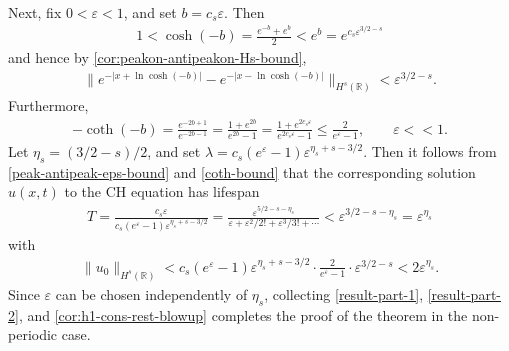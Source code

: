 \documentclass[12pt,reqno]{amsart}
\numberwithin{equation}{section}  %
\numberwithin{figure}{section}
\newcommand{\rr}{\mathbb{R}}
\newcommand{\ee}{\varepsilon}
\theoremstyle{plain}  %
\theoremstyle{definition}
\begin{document}
\\
Next, fix $0<\ee<1$, and set $b = c_s \ee$. Then
%
%
\begin{equation*}
  \begin{split}
    1 < \cosh(-b) = \frac{e^{-b}+ e^{b}}{2} < e^{b} = e^{c_s \ee^{3/2 - s}}
  \end{split}
\end{equation*}
%
%
and hence by \autoref{cor:peakon-antipeakon-Hs-bound},
%
%
%
%
\begin{equation}
  \label{peak-antipeak-eps-bound}
  \begin{split}
    \|e^{-| x + \ln \cosh (-b) |} - e^{-| x - \ln \cosh(-b) |}\|_{H^{s}(\rr)} <
    \ee^{3/2 - s}.
  \end{split}
\end{equation}
%
%
Furthermore,
%
%
\begin{equation}
  \label{coth-bound}
  \begin{split}
    -\coth(-b) = \frac{e^{-2b + 1}}{e^{-2b - 1}} = \frac{1 +
    e^{2b}}{e^{2b}-1} = \frac{1 + e^{2c_{s} \ee}}{e^{2c_{s}\ee} -1} \le
    \frac{2}{e^{\ee} -1}, \qquad \ee <<1.
  \end{split}
\end{equation}
%
%
Let $\eta_s = (3/2- s)/2$, and set $\lambda = c_{s}(e^{\ee}-1)\ee^{\eta_s + s-3/2}$. Then it follows from
\eqref{peak-antipeak-eps-bound} and \eqref{coth-bound} that the corresponding solution
$u(x,t)$ to the CH equation has lifespan
%
%
\begin{equation}
  \label{result-part-1}
  \begin{split}
    T = \frac{c_{s}\ee}{c_{s}(e^{\ee}-1)\ee^{\eta_s + s -3/2}} = \frac{\ee^{5/2
    - s - \eta_s }}{\ee
    + \ee^2/2! + \ee^3/3! + \cdots} < \ee^{3/2 -s - \eta_s} = \ee^{\eta_s}
  \end{split}
\end{equation}
%
%
with  
\begin{equation}
  \label{result-part-2}
  \begin{split}
    \|u_0\|_{H^s(\rr)}< c_{s}(e^{\ee}-1)\ee^{\eta_s + s -3/2} \cdot \frac{2}{e^{\ee}-1}
    \cdot \ee^{3/2 - s} < 2 \ee^{\eta_s}.  
  \end{split}
\end{equation}
%
%
Since $\ee$ can be chosen independently of $\eta_s$, collecting
\eqref{result-part-1}, \eqref{result-part-2}, and
\autoref{cor:h1-cons-rest-blowup} completes the proof of the theorem in the
non-periodic case. \quad \qedsymbol
%
%
%

%
%
%
%
%
\end{document}
